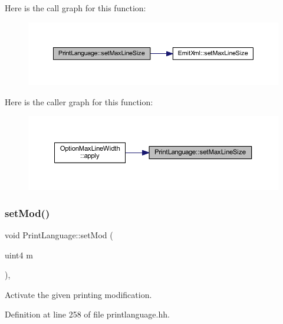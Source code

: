 Here is the call graph for this function\+:
\nopagebreak
\begin{figure}[H]
\begin{center}
\leavevmode
\includegraphics[width=350pt]{class_print_language_a15e8b97bbcbc19b0235339cafeb39d79_cgraph}
\end{center}
\end{figure}
Here is the caller graph for this function\+:
\nopagebreak
\begin{figure}[H]
\begin{center}
\leavevmode
\includegraphics[width=350pt]{class_print_language_a15e8b97bbcbc19b0235339cafeb39d79_icgraph}
\end{center}
\end{figure}
\mbox{\label{class_print_language_a41989161469e866dc8af2b9f4726fb35}} 
\subsubsection{\texorpdfstring{setMod()}{setMod()}}
{\footnotesize\ttfamily void Print\+Language\+::set\+Mod (\begin{DoxyParamCaption}\item[{uint4}]{m }\end{DoxyParamCaption})\hspace{0.3cm}{\ttfamily [inline]}, {\ttfamily [protected]}}



Activate the given printing modification. 



Definition at line 258 of file printlanguage.\+hh.

